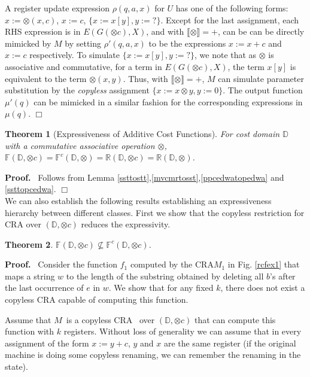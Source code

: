 \documentclass[11pt]{article}
\newtheorem{theorem}{Theorem}
\def\Proof{{\bf Proof.}}
\def\qed{{\bf $\Box$}}
\def\qed{{\bf $\Box$}}
\newcommand{\domain}{\ensuremath{\mathbb{D}}}
\def\hole{?}
\newcommand{\CG}{G}
\newcommand{\CF}{{\mathbb F}}
\newcommand{\CCF}{{\mathbb F}^c}
\newcommand{\reg}[1]{{\mathbb R}(#1)}
\newcommand{\stt}{\ensuremath{U}}
\newcommand{\interp}[1]{\ensuremath{\llbracket #1\rrbracket}}
\newcommand{\EDWA}{{CRA}\xspace}
\newcommand{\edwa}{\ensuremath{M}}
\def\myplus{\otimes}
\begin{document}
A register update expression $\rho(q,a,x)$ for $\stt$ has one of the
following forms: $x:=\myplus(x,c)$, $x:=c$, $\{x:=x[y],y:=\hole\}$.
Except for the last assignment, each RHS expression is in
$E(\CG(\myplus c),X)$, and with $\interp{\myplus} = +$, can be can be
directly mimicked by $\edwa$ by setting $\rho'(q,a,x)$ to be the
expressions  $x:=x+c$ and $x:=c$ respectively.  To simulate
$\{x:=x[y],y:=\hole\}$, we note that as $\myplus$ is associative and
commutative, for a term in $E(\CG(\myplus c),X)$, the term $x[y]$ is
equivalent to the term $\myplus(x,y)$. Thus, with $\interp{\myplus} =
+$, $\edwa$ can simulate parameter substitution by the {\em copyless}
assignment $\{x:=x\myplus y, y:=0\}$.  The output function $\mu'(q)$ can be
mimicked in a similar fashion for the corresponding expressions in
$\mu(q)$.
\qed



\begin{theorem}[Expressiveness of Additive Cost Functions]\label{regplus}
For cost domain $\domain$ with a commutative associative operation $\myplus$,
$\CF(\domain,\myplus c)=\CCF(\domain,\myplus)=\reg{\domain,\myplus c}=\reg{\domain,\myplus}$.
\end{theorem}
\Proof~ Follows from Lemma
\ref{ssttostt},\ref{mvcmrtosst},\ref{ppcedwatopedwa} and
\ref{ssttopcedwa}.
\qed \\

We can also establish the following results establishing an
expressiveness hierarchy between different classes.  First we show
that the copyless restriction for \EDWA over $(\domain, \myplus c)$
reduces the expressivity.

\begin{theorem}\label{thm:plus-c-copying-essential}
$\CF(\domain,\myplus c)\nsubseteq\CCF(\domain,\myplus c)$.
\end{theorem}

\Proof~ Consider the function $f_1$ computed by the \EDWA $M_1$ in
Fig.  \ref{rcfex1} that maps a string $w$ to the length of the
substring obtained by deleting all $b$'s after the last occurrence of
$e$ in $w$. We show that for any fixed $k$, there does not exist a
copyless \EDWA capable of computing this function.

Assume that \edwa~is a copyless \EDWA~ over $(\domain,\myplus c)$ that
can compute this function with $k$ registers.  Without loss of
generality we can assume that in every assignment of the form $x:=
y+c$, $y$ and $x$ are the same register (if the original machine is
doing some copyless renaming, we can remember the renaming in the
state).
\end{document}
